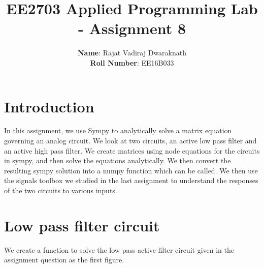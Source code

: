 \documentclass[11pt]{article}
\title{EE2703 Applied Programming Lab - Assignment 8}
\author{
  \textbf{Name}: Rajat Vadiraj Dwaraknath\\
  \textbf{Roll Number}: EE16B033
}
\begin{document}
    
    
    \maketitle
    
    

    
	

	
		
    \section{Introduction}\label{introduction}

In this assignment, we use Sympy to analytically solve a matrix equation
governing an analog circuit. We look at two circuits, an active low pass
filter and an active high pass filter. We create matrices using node
equations for the circuits in sympy, and then solve the equations
analytically. We then convert the resulting sympy solution into a numpy
function which can be called. We then use the signals toolbox we studied
in the last assignment to understand the responses of the two circuits
to various inputs.

	

	

	

	

	
		
    \section{Low pass filter circuit}\label{low-pass-filter-circuit}

We create a function to solve the low pass active filter circuit given
in the assignment question as the first figure.

	

	
		
	
	
		
	
		
			
		
	
		
			
		
	
		
			
		
	
		
			
		
	
		
			
		
	
		
			
		
	
		
			
\end{document}

